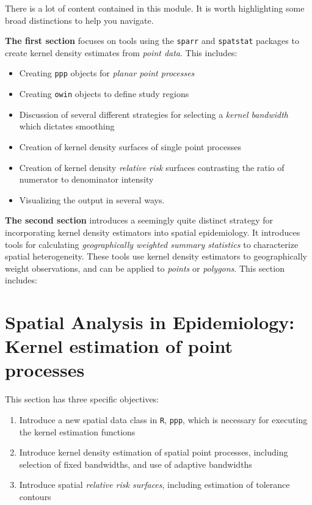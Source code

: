 \documentclass[
]{book}
\newcommand{\passthrough}[1]{#1}
\providecommand{\tightlist}{%
  \setlength{\itemsep}{0pt}\setlength{\parskip}{0pt}}
\begin{document}
There is a lot of content contained in this module. It is worth highlighting some broad distinctions to help you navigate.

\textbf{The first section} focuses on tools using the \passthrough{\lstinline!sparr!} and \passthrough{\lstinline!spatstat!} packages to create kernel density estimates from \emph{point data}. This includes:

\begin{itemize}
\tightlist
\item
  Creating \passthrough{\lstinline!ppp!} objects for \emph{planar point processes}
\item
  Creating \passthrough{\lstinline!owin!} objects to define study regions
\item
  Discussion of several different strategies for selecting a \emph{kernel bandwidth} which dictates smoothing
\item
  Creation of kernel density surfaces of single point processes
\item
  Creation of kernel density \emph{relative risk} surfaces contrasting the ratio of numerator to denominator intensity
\item
  Visualizing the output in several ways.
\end{itemize}

\textbf{The second section} introduces a seemingly quite distinct strategy for incorporating kernel density estimators into spatial epidemiology. It introduces tools for calculating \emph{geographically weighted summary statistics} to characterize spatial heterogeneity. These tools use kernel density estimators to geographically weight observations, and can be applied to \emph{points} or \emph{polygons}. This section includes:

\hypertarget{spatial-analysis-in-epidemiology-kernel-estimation-of-point-processes}{%
\section{Spatial Analysis in Epidemiology: Kernel estimation of point processes}\label{spatial-analysis-in-epidemiology-kernel-estimation-of-point-processes}}

This section has three specific objectives:

\begin{enumerate}
\def\labelenumi{\arabic{enumi}.}
\tightlist
\item
  Introduce a new spatial data class in \passthrough{\lstinline!R!}, \passthrough{\lstinline!ppp!}, which is necessary for executing the kernel estimation functions
\item
  Introduce kernel density estimation of spatial point processes, including selection of fixed bandwidths, and use of adaptive bandwidths
\item
  Introduce spatial \emph{relative risk surfaces}, including estimation of tolerance contours
\end{enumerate}
\end{document}
